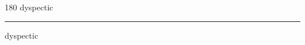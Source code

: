 
\begin{frame}
\begin{center}
\begin{turn}{180}
{\fontsize{2.5cm}{1em}\selectfont dyspectic}
\end{turn}
\vspace{1em}\par  
\hrule
\vspace{1em}\par  
{\fontsize{2.5cm}{1em}\selectfont dyspectic}
\end{center}
\end{frame}
